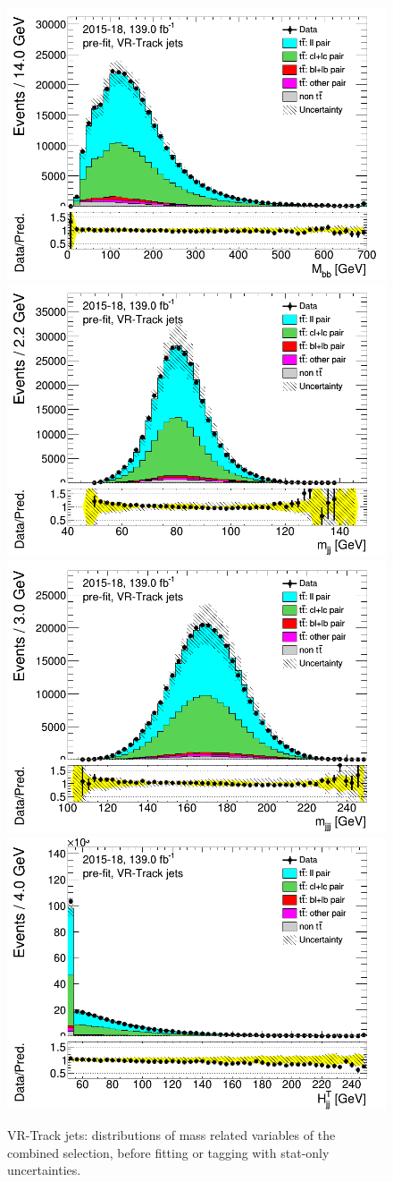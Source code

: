 	\newpage
	\begin{figure}[H]
	\includegraphics[width=.45\textwidth]{FTAG_plots/pretagNoRwwithhighpTVRJetsall/DataMC_h_Mbbtrackjet.png}
	\includegraphics[width=.45\textwidth]{FTAG_plots/pretagNoRwwithhighpTVRJetsall/DataMC_h_mjjtrackjet.png}\\
	\includegraphics[width=.45\textwidth]{FTAG_plots/pretagNoRwwithhighpTVRJetsall/DataMC_h_mjjjtrackjet.png}
	\includegraphics[width=.45\textwidth]{FTAG_plots/pretagNoRwwithhighpTVRJetsall/DataMC_h_Htjjtrackjet.png}\\
	\caption{VR-Track jets: distributions of mass related variables of the combined selection, 
	before fitting or tagging with stat-only uncertainties.} \label{fig:combined_mass_VRJets}
	\end{figure}
	
